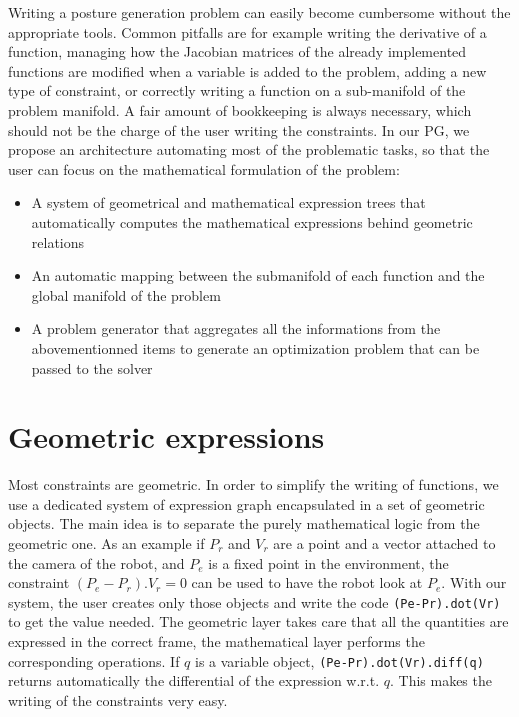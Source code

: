 Writing a posture generation problem can easily become cumbersome without the appropriate tools.
Common pitfalls are for example writing the derivative of a function, managing how the Jacobian matrices of the already implemented functions are modified when a variable is added to the problem, adding a new type of constraint, or correctly writing a function on a sub-manifold of the problem manifold.
A fair amount of bookkeeping is always necessary, which should not be the charge of the user writing the constraints.
In our PG, we propose an architecture automating most of the problematic tasks, so that the user can focus on the mathematical formulation of the problem:
\begin{itemize}
  \item A system of geometrical and mathematical expression trees that automatically computes the mathematical expressions behind geometric relations
  \item An automatic mapping between the submanifold of each function and the global manifold of the problem
  \item A problem generator that aggregates all the informations from the abovementionned items to generate an optimization problem that can be passed to the solver
\end{itemize}


\section{Geometric expressions}
\label{sec:geometric_expressions}

Most constraints are geometric.
In order to simplify the writing of functions, we use a dedicated system of expression graph encapsulated in a set of geometric objects.
The main idea is to separate the purely mathematical logic from the geometric one.
As an example if $P_r$ and $V_r$ are a point and a vector attached to the camera of the robot, and $P_e$ is a fixed point in the environment, the constraint $(P_e - P_r).V_r = 0$ can be used to have the robot look at $P_e$.
With our system, the user creates only those objects and write the code {\tt (Pe-Pr).dot(Vr)} to get the value needed.
The geometric layer takes care that all the quantities are expressed in the correct frame, the mathematical layer performs the corresponding operations.
If $q$ is a variable object, {\tt (Pe-Pr).dot(Vr).diff(q)} returns automatically the differential of the expression w.r.t. $q$. This makes the writing of the constraints very easy.

